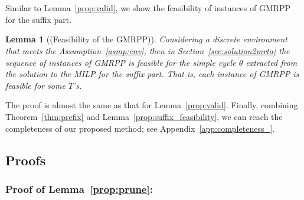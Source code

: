 \documentclass[Afour,sageh,times]{sagej}
\newtheorem{lem}[thm]{Lemma}
\newtheorem{prop}[thm]{Proposition}
\newcommand{\ltl}{ {\it LTL}$_{-\bigcirc}$ }
\newcommand{\autop}{\ccalA_{\phi}}
\renewcommand{\ap}[3]{\mathcal{\pi}_{{#1},{#2}}^{#3}}
\begin{document}
{{Similar to Lemma~\ref{prop:valid}, we show the feasibility of instances of GMRPP for the suffix part. %
\begin{lem}[(Feasibility of the GMRPP)]\label{prop:suffix_valid}
 Considering  a discrete environment that meets the Assumption~\ref{asmp:env}, then in Section~\ref{sec:solution2mrta} the sequence of instances of GMRPP  is feasible for the simple cycle $\tilde{\theta}$ extracted from the solution to the MILP for the suffix part. That is, each instance of GMRPP is feasible for some $T$'s.
\end{lem}
The  proof is almost the same as that for Lemma~\ref{prop:valid}. Finally, combining Theorem~\ref{thm:prefix} and Lemma~\ref{prop:suffix_feasibility}, we can reach the completeness of our proposed method; see Appendix~\ref{app:completeness_}.

\subsection{Proofs}
\subsubsection{Proof of Lemma~\ref{prop:prune}:}\label{app:prune}

}}
\end{document}
